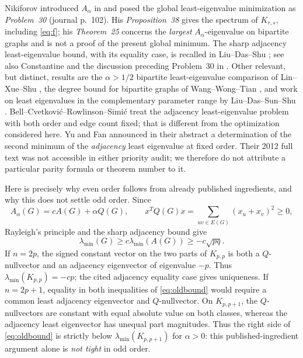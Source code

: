 \documentclass[11pt]{amsart}
\theoremstyle{definition}
\newcommand{\Aa}{A_{\alpha}}
\newcommand{\lam}{\lambda_{\min}}
\begin{document}
Nikiforov introduced $A_\alpha$ in \cite{Nikiforov2017} and posed the global least-eigenvalue minimization as \emph{Problem~30} (journal p.~102). His \emph{Proposition~38} gives the spectrum of $K_{r,s}$, including \eqref{eq:f}; his \emph{Theorem~25} concerns the \emph{largest} $A_\alpha$-eigenvalue on bipartite graphs and is not a proof of the present global minimum. The sharp adjacency least-eigenvalue bound, with its equality case, is recalled in Liu--Das--Shu \cite[Lemma~2.5]{LiuDasShu2020}; see also Constantine \cite{Constantine1985} and the discussion preceding Problem~30 in \cite{Nikiforov2017}. Other relevant, but distinct, results are the $\alpha>1/2$ bipartite least-eigenvalue comparison of Lin--Xue--Shu \cite[Theorem~3.3]{LinXueShu2018}, the degree bound for bipartite graphs of Wang--Wong--Tian \cite[Theorem~1.3]{WangWongTian2020}, and work on least eigenvalues in the complementary parameter range by Liu--Das--Sun--Shu \cite{LiuDasSunShu2020}. Bell--Cvetkovi\'c--Rowlinson--Simi\'c \cite{BellEtAlI,BellEtAlII} treat the adjacency least-eigenvalue problem with both order and edge count fixed; that is different from the optimization considered here. Yu and Fan \cite{YuFan2012} announced in their abstract a determination of the second minimum of the \emph{adjacency} least eigenvalue at fixed order. Their 2012 full text was not accessible in either priority audit; we therefore do not attribute a particular parity formula or theorem number to it.

Here is precisely why even order follows from already published ingredients, and why this does not settle odd order. Since
\begin{equation}\label{eq:Qdecomp}
 \Aa(G)=cA(G)+\alpha Q(G),\qquad
 x^TQ(G)x=\sum_{uv\in E(G)}(x_u+x_v)^2\ge0,
\end{equation}
Rayleigh's principle and the sharp adjacency bound give
\begin{equation}\label{eq:oldbound}
 \lam(G)\ge c\lambda_{\min}(A(G))\ge-c\sqrt{pq}.
\end{equation}
If $n=2p$, the signed constant vector on the two parts of $K_{p,p}$ is both a $Q$-nullvector and an adjacency eigenvector of eigenvalue $-p$. Thus $\lam(K_{p,p})=-cp$; the cited adjacency equality case gives uniqueness. If $n=2p+1$, equality in both inequalities of \eqref{eq:oldbound} would require a common least adjacency eigenvector and $Q$-nullvector. On $K_{p,p+1}$, the $Q$-nullvectors are constant with equal absolute value on both classes, whereas the adjacency least eigenvector has unequal part magnitudes. Thus the right side of \eqref{eq:oldbound} is strictly below $\lam(K_{p,p+1})$ for $\alpha>0$: this published-ingredient argument alone is \emph{not tight} in odd order.
\end{document}
